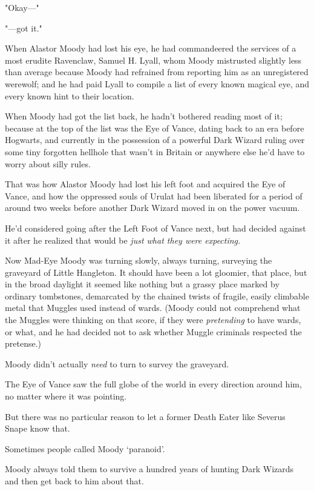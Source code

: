 "Okay—"

"—got it."

When Alastor Moody had lost his eye, he had commandeered the services of a most
erudite Ravenclaw, Samuel H. Lyall, whom Moody mistrusted slightly less than
average because Moody had refrained from reporting him as an unregistered
werewolf; and he had paid Lyall to compile a list of every known magical eye,
and every known hint to their location.

When Moody had got the list back, he hadn't bothered reading most of it;
because at the top of the list was the Eye of Vance, dating back to an era
before Hogwarts, and currently in the possession of a powerful Dark Wizard
ruling over some tiny forgotten hellhole that wasn't in Britain or anywhere
else he'd have to worry about silly rules.

That was how Alastor Moody had lost his left foot and acquired the Eye of
Vance, and how the oppressed souls of Urulat had been liberated for a period of
around two weeks before another Dark Wizard moved in on the power vacuum.

He'd considered going after the Left Foot of Vance next, but had decided
against it after he realized that would be \emph{just what they were expecting.}

Now Mad-Eye Moody was turning slowly, always turning, surveying the graveyard
of Little Hangleton. It should have been a lot gloomier, that place, but in the
broad daylight it seemed like nothing but a grassy place marked by ordinary
tombstones, demarcated by the chained twists of fragile, easily climbable metal
that Muggles used instead of wards. (Moody could not comprehend what the
Muggles were thinking on that score, if they were \emph{pretending} to have
wards, or what, and he had decided not to ask whether Muggle criminals
respected the pretense.)

Moody didn't actually \emph{need} to turn to survey the graveyard.

The Eye of Vance saw the full globe of the world in every direction around him,
no matter where it was pointing.

But there was no particular reason to let a former Death Eater like Severus
Snape know that.

Sometimes people called Moody `paranoid'.

Moody always told them to survive a hundred years of hunting Dark Wizards and
then get back to him about that.

